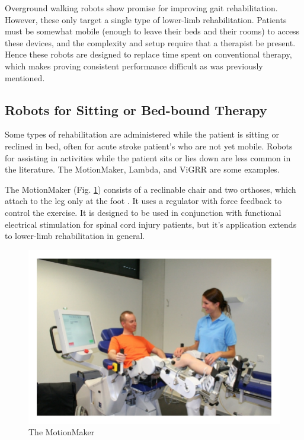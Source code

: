 \documentclass[12pt]{report}
\begin{document}
	
	Overground walking robots show promise for improving gait rehabilitation. However, these only target a single type of lower-limb rehabilitation. Patients must be somewhat mobile (enough to leave their beds and their rooms) to access these devices, and the complexity and setup require that a therapist be present. Hence these robots are designed to replace time spent on conventional therapy, which makes proving consistent performance difficult as was previously mentioned. 
	
	\subsection{Robots for Sitting or Bed-bound Therapy}
	
	Some types of rehabilitation are administered while the patient is sitting or reclined in bed, often for acute stroke patient's who are not yet mobile. Robots for assisting in activities while the patient sits or lies down are less common in the literature. The MotionMaker, Lambda, and ViGRR are some examples. 
	
	The MotionMaker (Fig. \ref{fig:Motionmaker}) consists of a reclinable chair and two orthoses, which attach to the leg only at the foot \cite{Schmitt2004}. It uses a regulator with force feedback to control the exercise. It is designed to be used in conjunction with functional electrical stimulation for spinal cord injury patients, but it's application extends to lower-limb rehabilitation in general. 
	
	\begin{figure}[h] 
		\centering
		\includegraphics[width=0.75\linewidth]{Motionmaker}
		\caption{The MotionMaker}
		\label{fig:Motionmaker}
	\end{figure}
	
\end{document}
